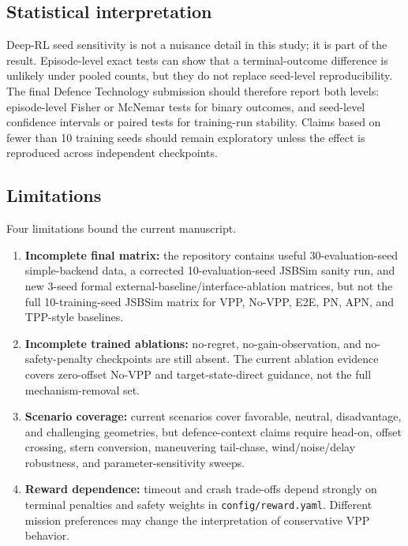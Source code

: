 \subsection{Statistical interpretation}

Deep-RL seed sensitivity is not a nuisance detail in this study; it is part of the result. Episode-level exact tests can show that a terminal-outcome difference is unlikely under pooled counts, but they do not replace seed-level reproducibility. The final Defence Technology submission should therefore report both levels: episode-level Fisher or McNemar tests for binary outcomes, and seed-level confidence intervals or paired tests for training-run stability. Claims based on fewer than 10 training seeds should remain exploratory unless the effect is reproduced across independent checkpoints.

\subsection{Limitations}

Four limitations bound the current manuscript.

\begin{enumerate}
    \item \textbf{Incomplete final matrix:} the repository contains useful 30-evaluation-seed simple-backend data, a corrected 10-evaluation-seed JSBSim sanity run, and new 3-seed formal external-baseline/interface-ablation matrices, but not the full 10-training-seed JSBSim matrix for VPP, No-VPP, E2E, PN, APN, and TPP-style baselines.
    \item \textbf{Incomplete trained ablations:} no-regret, no-gain-observation, and no-safety-penalty checkpoints are still absent. The current ablation evidence covers zero-offset No-VPP and target-state-direct guidance, not the full mechanism-removal set.
    \item \textbf{Scenario coverage:} current scenarios cover favorable, neutral, disadvantage, and challenging geometries, but defence-context claims require head-on, offset crossing, stern conversion, maneuvering tail-chase, wind/noise/delay robustness, and parameter-sensitivity sweeps.
    \item \textbf{Reward dependence:} timeout and crash trade-offs depend strongly on terminal penalties and safety weights in \texttt{config/reward.yaml}. Different mission preferences may change the interpretation of conservative VPP behavior.
\end{enumerate}

